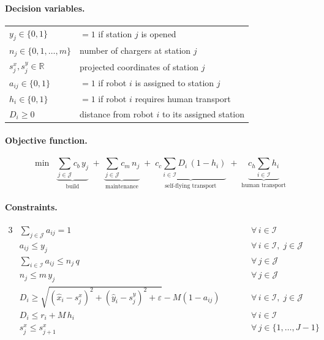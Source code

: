 \documentclass[11pt,a4paper]{article}
\begin{document}
\paragraph{Decision variables.}
\begin{tabular}{@{}ll@{}}
$y_j \in \{0,1\}$           & $= 1$ if station $j$ is opened \\
$n_j \in \{0,1,\dots,m\}$   & number of chargers at station $j$ \\
$s_j^x, s_j^y \in \mathbb{R}$ & projected coordinates of station $j$ \\
$a_{ij} \in \{0,1\}$        & $= 1$ if robot $i$ is assigned to station $j$ \\
$h_i \in \{0,1\}$           & $= 1$ if robot $i$ requires human transport \\
$D_i \geq 0$                & distance from robot $i$ to its assigned station
\end{tabular}

\medskip
\paragraph{Objective function.}
\begin{equation}\label{eq:q1a-obj}
  \min \;\;
  \underbrace{\sum_{j \in \mathcal{J}} c_b \, y_j}_{\text{build}}
  \;+\;
  \underbrace{\sum_{j \in \mathcal{J}} c_m \, n_j}_{\text{maintenance}}
  \;+\;
  \underbrace{c_c \sum_{i \in \mathcal{I}} D_i \,(1 - h_i)}_{\text{self-flying transport}}
  \;+\;
  \underbrace{c_h \sum_{i \in \mathcal{I}} h_i}_{\text{human transport}}
\end{equation}

\medskip
\paragraph{Constraints.}
\begin{alignat}{3}
  & \sum_{j \in \mathcal{J}} a_{ij} = 1
    && \qquad \forall\, i \in \mathcal{I}
    \label{eq:c1} \tag{C1} \\[4pt]
  & a_{ij} \leq y_j
    && \qquad \forall\, i \in \mathcal{I},\; j \in \mathcal{J}
    \label{eq:c2} \tag{C2} \\[4pt]
  & \sum_{i \in \mathcal{I}} a_{ij} \leq n_j \, q
    && \qquad \forall\, j \in \mathcal{J}
    \label{eq:c3} \tag{C3} \\[4pt]
  & n_j \leq m \, y_j
    && \qquad \forall\, j \in \mathcal{J}
    \label{eq:c4} \tag{C4} \\[4pt]
  & D_i \geq \sqrt{(\hat{x}_i - s_j^x)^2 + (\hat{y}_i - s_j^y)^2 + \varepsilon} - M(1 - a_{ij})
    && \qquad \forall\, i \in \mathcal{I},\; j \in \mathcal{J}
    \label{eq:c5} \tag{C5} \\[4pt]
  & D_i \leq r_i + M \, h_i
    && \qquad \forall\, i \in \mathcal{I}
    \label{eq:c6} \tag{C6} \\[4pt]
  & s_j^x \leq s_{j+1}^x
    && \qquad \forall\, j \in \{1,\dots,J{-}1\}
    \label{eq:c7} \tag{C7}
\end{alignat}
\end{document}
